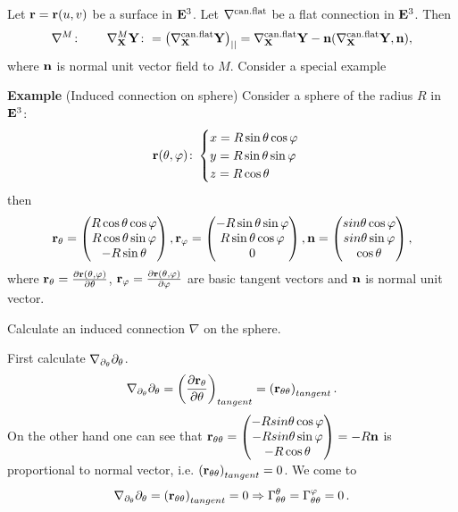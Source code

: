 \documentclass[12pt]{article}
\theoremstyle{theorem}
\numberwithin{equation}{section}
\begin{document}
Let ${\bf r}={\bf r}(u,v)$ be a surface in ${\bf E}^3$. Let $\nabla^{\rm can.flat}$ be a flat connection in ${\bf E}^3$.
   Then
\begin{equation}\label{inducedconnection1}
\nabla^{M}\colon\qquad \nabla^{M}_{\bf X}{\bf Y} \colon =\left(\nabla^{\rm can.flat}_{\bf X}{\bf Y}\right)_{||}=
\nabla^{\rm can.flat}_{\bf X}{\bf Y}-
{\bf n}(\nabla^{\rm can.flat}_{\bf X}{\bf Y},{\bf n}),
\end{equation}
where ${\bf n}$ is normal unit vector field to $M$. Consider a special example

  {\bf Example} (Induced connection on sphere)
   Consider a sphere of the radius $R$ in ${\bf E}^3$:
              $$
           {\bf r}(\theta,\varphi)\colon \begin{cases}
           x=R\sin\theta \cos\varphi\cr
           y=R\sin\theta \sin\varphi\cr
           z=R\cos\theta\cr
           \end{cases}
              $$
then
           $$
      {\bf r}_{\theta}=\begin{pmatrix}
            R\cos\theta\cos\varphi\cr
            R\cos\theta\sin\varphi\cr
            -R\sin\theta\cr
                  \end{pmatrix},
       {\bf r}_{\varphi}=\begin{pmatrix}
            -R\sin\theta\sin\varphi\cr
            R\sin\theta\cos\varphi\cr
            0\cr
                  \end{pmatrix},
                  {\bf n}=\begin{pmatrix}
            sin\theta\cos\varphi\cr
            sin\theta\sin\varphi\cr
            \cos\theta\cr
                  \end{pmatrix},
           $$
where ${\bf r}_\theta={\partial {\bf r}(\theta,\varphi)\over \partial \theta}$,
${\bf r}_\varphi={\partial {\bf r}(\theta,\varphi)\over \partial \varphi}$ are basic tangent vectors and ${\bf n}$ is normal unit vector.

Calculate an induced connection  $\nabla$ on the sphere.

First calculate $\nabla_{\partial_\theta}\partial_\theta$.
\begin{equation*}
    \nabla_{\partial_\theta}\partial_\theta=\left({\partial {\bf r}_\theta\over \partial\theta}\right)_{tangent}=
    \left({\bf r}_{\theta\theta}\right)_{tangent}.
\end{equation*}
On the other hand one can see that ${\bf r}_{\theta\theta}=\begin{pmatrix}
            -Rsin\theta\cos\varphi\cr
            -Rsin\theta\sin\varphi\cr
            -R\cos\theta\cr
                  \end{pmatrix}=-R{\bf n}$ is proportional to normal vector, i.e. $\left({\bf r}_{\theta\theta}\right)_{tangent}=0$.
                  We come to
\begin{equation}\label{inducedonsphere4}
    \nabla_{\partial_\theta}\partial_\theta=\left({\bf r}_{\theta\theta}\right)_{tangent}=0 \Rightarrow
    \Gamma^\theta_{\theta\theta}=\Gamma^\varphi_{\theta\theta}=0\,.
\end{equation}
\end{document}

